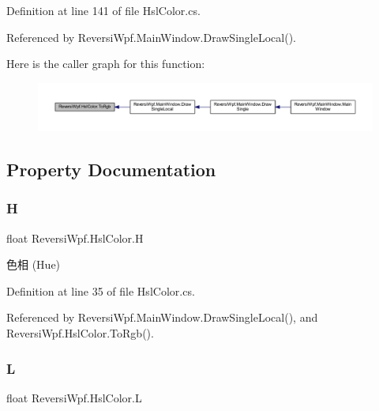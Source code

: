 Definition at line 141 of file Hsl\+Color.\+cs.



Referenced by Reversi\+Wpf.\+Main\+Window.\+Draw\+Single\+Local().

Here is the caller graph for this function\+:\nopagebreak
\begin{figure}[H]
\begin{center}
\leavevmode
\includegraphics[width=350pt]{class_reversi_wpf_1_1_hsl_color_aba11bae61cc67fcece49cbc4b18db8b1_icgraph}
\end{center}
\end{figure}


\subsection{Property Documentation}
\mbox{\label{class_reversi_wpf_1_1_hsl_color_a8b56c1b47fa4880e598829435ca25122}} 
\subsubsection{\texorpdfstring{H}{H}}
{\footnotesize\ttfamily float Reversi\+Wpf.\+Hsl\+Color.\+H\hspace{0.3cm}{\ttfamily [get]}}



色相 (Hue) 



Definition at line 35 of file Hsl\+Color.\+cs.



Referenced by Reversi\+Wpf.\+Main\+Window.\+Draw\+Single\+Local(), and Reversi\+Wpf.\+Hsl\+Color.\+To\+Rgb().

\mbox{\label{class_reversi_wpf_1_1_hsl_color_a8d465b3c48d716f819d8a53a4eca3d93}} 
\subsubsection{\texorpdfstring{L}{L}}
{\footnotesize\ttfamily float Reversi\+Wpf.\+Hsl\+Color.\+L\hspace{0.3cm}{\ttfamily [get]}}



